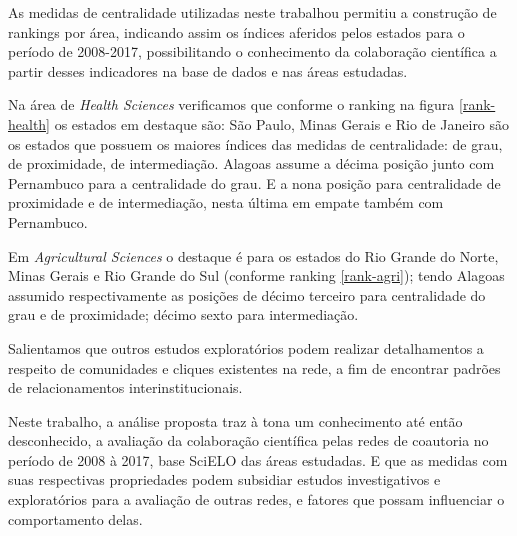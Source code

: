 
As medidas de centralidade utilizadas neste trabalhou permitiu a construção de rankings por área, indicando assim os índices aferidos pelos estados para o período de 2008-2017, possibilitando o conhecimento da colaboração científica a partir desses indicadores na base de dados e nas áreas estudadas.

Na área de \textit{Health Sciences} verificamos que conforme o ranking na figura \ref{rank-health} os estados em destaque são: São Paulo, Minas Gerais e Rio de Janeiro são os estados que possuem os maiores índices das medidas de centralidade: de grau, de proximidade, de intermediação. Alagoas assume a décima posição junto com Pernambuco para a centralidade do grau. E a nona posição para centralidade de proximidade e de intermediação, nesta última em empate também com Pernambuco.

Em \textit{Agricultural Sciences} o destaque é para os estados do Rio Grande do Norte, Minas Gerais e Rio Grande do Sul (conforme ranking \ref{rank-agri}); tendo Alagoas assumido respectivamente as posições de décimo terceiro para centralidade do grau e de proximidade; décimo sexto para intermediação. 

Salientamos que outros estudos exploratórios podem realizar detalhamentos a respeito de comunidades e cliques existentes na rede, a fim de encontrar padrões de relacionamentos interinstitucionais. 

Neste trabalho, a análise proposta traz à tona um conhecimento até então desconhecido, a avaliação da colaboração científica pelas redes de coautoria no período de 2008 à 2017, base SciELO das áreas estudadas. E que as medidas com suas respectivas propriedades podem subsidiar estudos investigativos e exploratórios para a avaliação de outras redes, e fatores que possam influenciar o comportamento delas.
